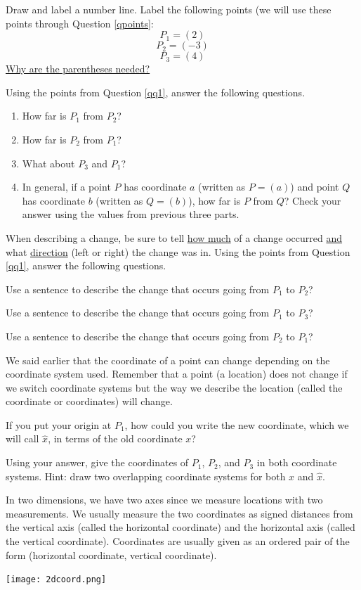 \bq\label{qq1} Draw and label a number line. Label the following points (we will use these points through Question \ref{qpoints}:
$$P_1=(2)$$
$$P_2 =(-3)$$
$$P_3=(4)$$
\underline{Why are the parentheses needed?}
\eq

\bq Using the points from Question \ref{qq1}, answer the following questions.
\begin{enumerate}
\item How far is $P_1$ from $P_2$?
\item How far is $P_2$ from $P_1$?
\item What about $P_3$ and $P_1$?
\item In general, if a point $P$ has coordinate $a$ (written as $P=(a)$) and point $Q$ has coordinate $b$ (written as $Q=(b)$), how far is $P$ from $Q$? Check your answer using the values from previous three parts.
\end{enumerate}
\eq


\bq When describing a change, be sure to tell \underline{how much} of a change occurred \underline{and} what \underline{direction} (left or right) the change was in. Using the points from Question \ref{qq1}, answer the following questions.
\be
\item Use a sentence to describe the change that occurs going from $P_1$ to $P_2$?
\item Use a sentence to describe the change that occurs going from $P_1$ to $P_3$?
\item Use a sentence to describe the change that occurs going from $P_2$ to $P_1$?
\ee\eq

\bq\label{qpoints} We said earlier that the coordinate of a point can change depending on the coordinate system used. Remember that a point (a location) does not change if we switch coordinate systems but the way we describe the location (called the coordinate or coordinates) will change.\be
\item If you put your origin at $P_1$, how could you write the new coordinate, which we will call $\hat{x}$, in terms of the old coordinate $x$?
\item Using your answer, give the coordinates of $P_1$, $P_2$, and $P_3$ in both coordinate systems. Hint: draw two overlapping coordinate systems for both $x$ and $\hat{x}$.
\ee
\eq


\begin{info}In two dimensions, we have two axes since we measure locations with two measurements. We usually measure the two coordinates as signed distances from the vertical axis (called the horizontal coordinate) and the horizontal axis (called the vertical coordinate). Coordinates are usually given as an ordered pair of the form (horizontal coordinate, vertical coordinate).

\begin{center} \texttt{[image: 2dcoord.png]} \end{center}

\end{info}


